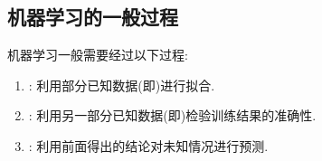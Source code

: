 \documentclass{ctexart}
\begin{document}
\subsection{机器学习的一般过程}
\begin{theorem}[机器学习的一般过程]
    机器学习一般需要经过以下过程:
    \begin{enumerate}[label=\tbf{\arabic*.},topsep=0pt,parsep=0pt,itemsep=0pt,partopsep=0pt]
        \item {}: 利用部分已知数据(即)进行拟合.
        \item {}: 利用另一部分已知数据(即)检验训练结果的准确性.
        \item {}: 利用前面得出的结论对未知情况进行预测.
    \end{enumerate}
\end{theorem}
\end{document}
